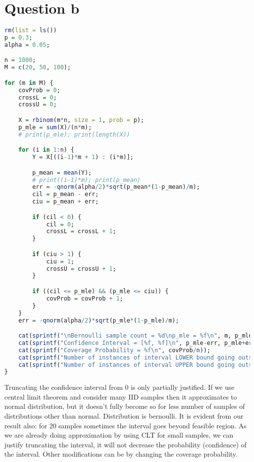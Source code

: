 \documentclass{article}
\begin{document}
\pagebreak

\section{Question b}


\begin{lstlisting}[language=R]
rm(list = ls())
p = 0.3;
alpha = 0.05;

n = 1000;
M = c(20, 50, 100);

for (m in M) {
	covProb = 0;
	crossL = 0;
	crossU = 0;

	X = rbinom(m*n, size = 1, prob = p);
	p_mle = sum(X)/(n*m);
	# print(p_mle); print(length(X))

	for (i in 1:n) {
		Y = X[((i-1)*m + 1) : (i*m)];

		p_mean = mean(Y);
		# print((i-1)*m); print(p_mean)
		err = -qnorm(alpha/2)*sqrt(p_mean*(1-p_mean)/m);
		cil = p_mean - err;
		ciu = p_mean + err;

		if (cil < 0) {
			cil = 0;
			crossL = crossL + 1;
		}

		if (ciu > 1) {
			ciu = 1;
			crossU = crossU + 1;
		}

		if ((cil <= p_mle) && (p_mle <= ciu)) {
			covProb = covProb + 1;
		}
	}
	err = -qnorm(alpha/2)*sqrt(p_mle*(1-p_mle)/m);

	cat(sprintf("\nBernoulli sample count = %d\np_mle = %f\n", m, p_mle));
	cat(sprintf("Confidence Interval = [%f, %f]\n", p_mle-err, p_mle+err));
	cat(sprintf("Coverage Probability = %f\n", covProb/n));
	cat(sprintf("Number of instances of interval LOWER bound going outside parameter space = %d\n", crossL));
	cat(sprintf("Number of instances of interval UPPER bound going outside parameter space = %d\n", crossU));
}
\end{lstlisting}

Truncating the confidence interval from 0 is only partially justified. If we use central limit theorem and consider many IID samples then it approximates to normal distribution, but it doesn't fully become so for less number of samples of distributions other than normal. Distribution is bernoulli. It is evident from our result also: for 20 samples sometimes the interval goes beyond feasible region. As we are already doing approximation by using CLT for small samples, we can justify truncating the interval, it will not decrease the probability (confidence) of the interval. Other modifications can be by changing the coverage probability.
\end{document}
